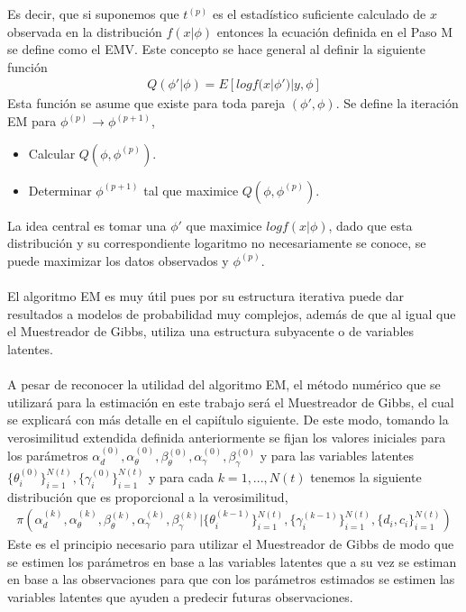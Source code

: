 Es decir, que si suponemos que $t^{(p)}$ es el estad\'istico suficiente calculado de $x$ observada en la distribuci\'on $f(x|\phi)$ entonces la ecuaci\'on definida en el Paso M se define como el EMV. Este concepto se hace general al definir la siguiente funci\'on
\begin{align*}
Q(\phi'|\phi)=E[log f(x|\phi')|y,\phi]
\end{align*}
Esta funci\'on se asume que existe para toda pareja $(\phi',\phi)$. Se define la iteraci\'on EM para $\phi^{(p)} \to \phi^{(p+1)}$,
\begin{itemize}
\item Calcular $Q(\phi,\phi^{(p)})$.
\item Determinar $\phi^{(p+1)}$ tal que maximice $Q(\phi,\phi^{(p)})$.
\end{itemize}
La idea central es tomar una $\phi'$ que maximice $log f(x|\phi)$, dado que esta distribuci\'on y su correspondiente logaritmo no necesariamente se conoce, se puede maximizar los datos observados y $\phi^{(p)}$.\\
\\
El algoritmo EM es muy \'util pues por su estructura iterativa puede dar resultados a modelos de probabilidad muy complejos, adem\'as de que al igual que el Muestreador de Gibbs, utiliza una estructura subyacente o de variables latentes.\\
\\
A pesar de reconocer la utilidad del algoritmo EM, el m\'etodo num\'erico que se utilizar\'a para la estimaci\'on en este trabajo ser\'a el Muestreador de Gibbs, el cual se explicar\'a con m\'as detalle en el capi\'itulo siguiente. De este modo, tomando la verosimilitud extendida definida anteriormente se fijan los valores iniciales para los par\'ametros $\alpha_d^{(0)},\alpha_\theta^{(0)},\beta_\theta^{(0)},\alpha_\gamma^{(0)},\beta_\gamma^{(0)}$ y para las variables latentes $\{\theta_i^{(0)}\}_{i=1}^{N(t)},\{\gamma_i^{(0)}\}_{i=1}^{N(t)}$ y para cada $k=1,...,N(t)$ tenemos la siguiente distribuci\'on que es proporcional a la verosimilitud,
\begin{align*}
\pi(\alpha_d^{(k)},\alpha_\theta^{(k)},\beta_\theta^{(k)},\alpha_\gamma^{(k)},\beta_\gamma^{(k)}|\{\theta_i^{(k-1)}\}_{i=1}^{N(t)},\{\gamma_i^{(k-1)}\}_{i=1}^{N(t)},\{d_i,c_i\}_{i=1}^{N(t)})
\end{align*}
Este es el principio necesario para utilizar el Muestreador de Gibbs de modo que se estimen los par\'ametros en base a las variables latentes que a su vez se estiman en base a las observaciones para que con los par\'ametros estimados se estimen las variables latentes que ayuden a predecir futuras observaciones. %